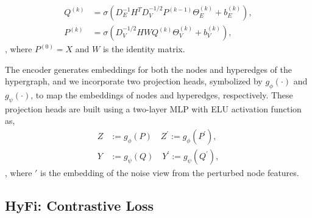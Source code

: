 \begin{equation}
\begin{aligned}
    Q^{(k)} &= \sigma\left( D_E^{-1} H^T D_V^{-1/2} P^{(k-1)} \Theta_E^{(k)} + b_E^{(k)} \right), \\
    P^{(k)} &= \sigma\left( D_V^{-1/2} HW Q^{(k)} \Theta_V^{(k)} + b_V^{(k)} \right),
\end{aligned}
\end{equation},
where \( P^{(0)} = X \) and \( W \) is the identity matrix. 

The encoder generates embeddings for both the nodes and hyperedges of the hypergraph, and we incorporate two projection heads, symbolized by \( g_{\phi}(\cdot)\) and \( g_{\psi}(\cdot)\), to map the embeddings of nodes and hyperedges, respectively. These projection heads are built using a two-layer MLP with ELU activation function\cite{clevert2015fast} as, 
\begin{equation}
\label{equ:add_noise2}
\begin{split}
    Z & := g_{\phi}(P)  \quad Z^{\prime} := g_{\phi}(P^{\prime}), \\
    Y & := g_{\psi}(Q)  \quad Y^{\prime} := g_{\psi}(Q^{\prime}),
\end{split}
\end{equation},
where \(\prime\) is the embedding of the noise view from the perturbed node features.




\subsection{HyFi: Contrastive Loss}

